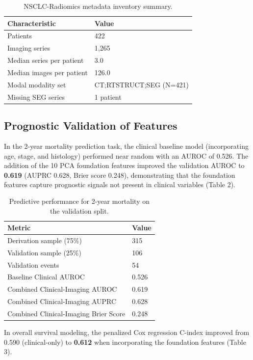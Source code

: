 \documentclass[11pt]{article}
\begin{document}
\begin{table}[H]
\centering
\caption{NSCLC-Radiomics metadata inventory summary.}
\begin{tabular}{ll}
\toprule
Characteristic & Value \\
\midrule
Patients & 422 \\
Imaging series & 1,265 \\
Median series per patient & 3.0 \\
Median images per patient & 126.0 \\
Modal modality set & CT;RTSTRUCT;SEG (N=421) \\
Missing SEG series & 1 patient \\
\bottomrule
\end{tabular}
\end{table}

\subsection*{Prognostic Validation of Features}
In the 2-year mortality prediction task, the clinical baseline model (incorporating age, stage, and histology) performed near random with an AUROC of 0.526. The addition of the 10 PCA foundation features improved the validation AUROC to \textbf{0.619} (AUPRC 0.628, Brier score 0.248), demonstrating that the foundation features capture prognostic signals not present in clinical variables (Table 2).

\begin{table}[H]
\centering
\caption{Predictive performance for 2-year mortality on the validation split.}
\begin{tabular}{ll}
\toprule
Metric & Value \\
\midrule
Derivation sample (75\%) & 315 \\
Validation sample (25\%) & 106 \\
Validation events & 54 \\
Baseline Clinical AUROC & 0.526 \\
Combined Clinical-Imaging AUROC & 0.619 \\
Combined Clinical-Imaging AUPRC & 0.628 \\
Combined Clinical-Imaging Brier Score & 0.248 \\
\bottomrule
\end{tabular}
\end{table}

In overall survival modeling, the penalized Cox regression C-index improved from 0.590 (clinical-only) to \textbf{0.612} when incorporating the foundation features (Table 3).
\end{document}
